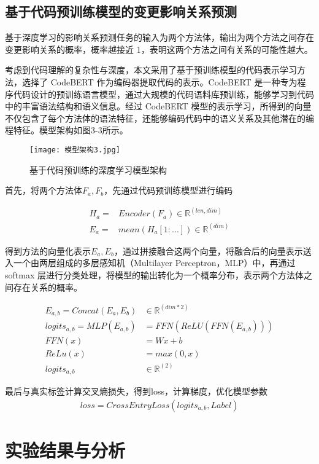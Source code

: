 \subsection{基于代码预训练模型的变更影响关系预测}

基于深度学习的影响关系预测任务的输入为两个方法体，输出为两个方法之间存在变更影响关系的概率，概率越接近 1，表明这两个方法之间有关系的可能性越大。

考虑到代码理解的复杂性与深度，本文采用了基于预训练模型的代码表示学习方法，选择了 CodeBERT 作为编码器提取代码的表示。CodeBERT 是一种专为程序代码设计的预训练语言模型，通过大规模的代码语料库预训练，能够学习到代码中的丰富语法结构和语义信息。经过 CodeBERT 模型的表示学习，所得到的向量不仅包含了每个方法体的语法特征，还能够编码代码中的语义关系及其他潜在的编程特征。模型架构如图3-3所示。

\begin{figure}[h]
\centering
\texttt{[image: 模型架构3.jpg]}
\caption{基于代码预训练的深度学习模型架构}
\end{figure}


首先，将两个方法体$ F_a, F_b$，先通过代码预训练模型进行编码

\begin{align}
H_a=&Encoder(F_a) \in \mathbb{R}^{(len,dim)} \\
E_a=&mean(H_a[1:...]) \in \mathbb{R}^{(dim)}
\end{align}

得到方法的向量化表示$ E_a, E_b$，通过拼接融合这两个向量，将融合后的向量表示送入一个由两层组成的多层感知机（Multilayer Perceptron，MLP）中，再通过 softmax 层进行分类处理，将模型的输出转化为一个概率分布，表示两个方法体之间存在关系的概率。

\begin{align}
E_{a,b}=Concat(E_a,E_b)& \in \mathbb{R}^{(dim*2)} \\
logits_{a,b}=MLP(E_{a,b})&=FFN(ReLU(FFN(E_{a,b}))) \\
FFN(x)&=Wx+b\\
ReLu(x)&=max(0,x)\\
logits_{a,b}& \in \mathbb{R}^{(2)}
\end{align}

最后与真实标签计算交叉熵损失，得到loss，计算梯度，优化模型参数
\begin{align}
loss=CrossEntryLoss(logits_{a,b}, Label)
\end{align}


\section{实验结果与分析}

